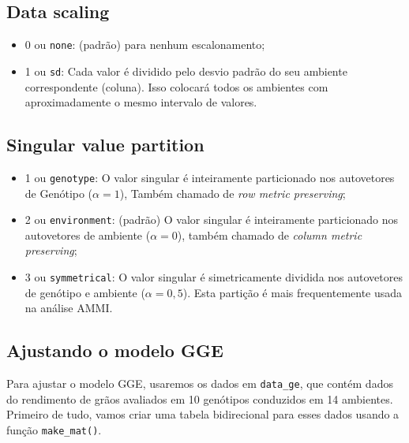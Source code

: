 \documentclass[
]{book}
\providecommand{\tightlist}{%
  \setlength{\itemsep}{0pt}\setlength{\parskip}{0pt}}
\begin{document}
\hypertarget{data-scaling}{%
\subsection{Data scaling}\label{data-scaling}}

\begin{itemize}
\tightlist
\item
  0 ou \texttt{none}: (padrão) para nenhum escalonamento;
\item
  1 ou \texttt{sd}: Cada valor é dividido pelo desvio padrão do seu ambiente correspondente (coluna). Isso colocará todos os ambientes com aproximadamente o mesmo intervalo de valores.
\end{itemize}

\hypertarget{singular-value-partition}{%
\subsection{Singular value partition}\label{singular-value-partition}}


\begin{itemize}
\tightlist
\item
  1 ou \texttt{genotype}: O valor singular é inteiramente particionado nos autovetores de Genótipo (\(\alpha = 1\)), Também chamado de \emph{row metric preserving};
\item
  2 ou \texttt{environment}: (padrão) O valor singular é inteiramente particionado nos autovetores de ambiente (\(\alpha = 0\)), também chamado de \emph{column metric preserving};
\item
  3 ou \texttt{symmetrical}: O valor singular é simetricamente dividida nos autovetores de genótipo e ambiente (\(\alpha = 0,5\)). Esta partição é mais frequentemente usada na análise AMMI.
\end{itemize}

\hypertarget{ajustando-o-modelo-gge}{%
\subsection{Ajustando o modelo GGE}\label{ajustando-o-modelo-gge}}

Para ajustar o modelo GGE, usaremos os dados em \texttt{data\_ge}, que contém dados do rendimento de grãos avaliados em 10 genótipos conduzidos em 14 ambientes. Primeiro de tudo, vamos criar uma tabela bidirecional para esses dados usando a função \texttt{make\_mat()}. 
\end{document}
